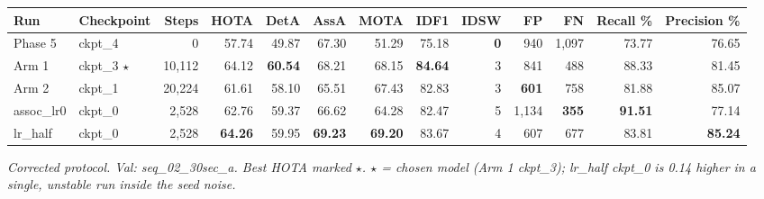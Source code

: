 \begin{table}[t]
\centering
\small
\begin{tabular}{llrrrrrrrrrrr}
\toprule
Run & Checkpoint & Steps & HOTA & DetA & AssA & MOTA & IDF1 & IDSW & FP & FN & Recall \% & Precision \% \\
\midrule
Phase 5 & ckpt\_4 & 0 & 57.74 & 49.87 & 67.30 & 51.29 & 75.18 & \textbf{0} & 940 & 1,097 & 73.77 & 76.65 \\
Arm 1 & ckpt\_3 $\star$ & 10,112 & 64.12 & \textbf{60.54} & 68.21 & 68.15 & \textbf{84.64} & 3 & 841 & 488 & 88.33 & 81.45 \\
Arm 2 & ckpt\_1 & 20,224 & 61.61 & 58.10 & 65.51 & 67.43 & 82.83 & 3 & \textbf{601} & 758 & 81.88 & 85.07 \\
assoc\_lr0 & ckpt\_0 & 2,528 & 62.76 & 59.37 & 66.62 & 64.28 & 82.47 & 5 & 1,134 & \textbf{355} & \textbf{91.51} & 77.14 \\
lr\_half & ckpt\_0 & 2,528 & \textbf{64.26} & 59.95 & \textbf{69.23} & \textbf{69.20} & 83.67 & 4 & 607 & 677 & 83.81 & \textbf{85.24} \\
\bottomrule
\end{tabular}
\par\smallskip\footnotesize\emph{Corrected protocol. Val: seq\_02\_30sec\_a. Best HOTA marked $\star$. $\star$ = chosen model (Arm 1 ckpt\_3); lr\_half ckpt\_0 is 0.14 higher in a single, unstable run inside the seed noise.}
\end{table}
